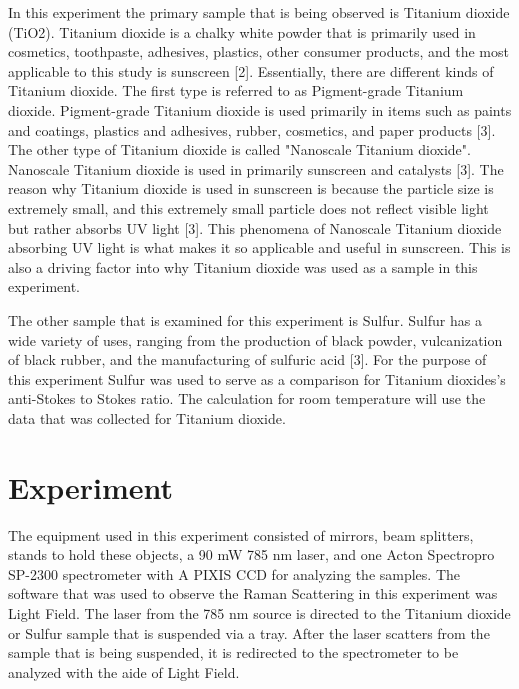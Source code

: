 \documentclass[twocolumn]{article}
\begin{document}
In this experiment the primary sample that is being observed is Titanium dioxide (TiO2). Titanium dioxide is a chalky white powder that is primarily used in cosmetics, toothpaste, adhesives, plastics, other consumer products, and the most applicable to this study is sunscreen [2]. Essentially, there are different kinds of Titanium dioxide. The first type is referred to as Pigment-grade Titanium dioxide. Pigment-grade Titanium dioxide is used primarily in items such as paints and coatings, plastics and adhesives, rubber, cosmetics, and paper products [3]. The other type of Titanium dioxide is called "Nanoscale Titanium dioxide". Nanoscale Titanium dioxide is used in primarily sunscreen and catalysts [3]. The reason why Titanium dioxide is used in sunscreen is because the particle size is extremely small, and this extremely small particle does not reflect visible light but rather absorbs UV light [3]. This phenomena of Nanoscale Titanium dioxide absorbing UV light is what makes it so applicable and useful in sunscreen. This is also a driving factor into why Titanium dioxide was used as a sample in this experiment. 

The other sample that is examined for this experiment is Sulfur. Sulfur has a wide variety of uses, ranging from the production of black powder, vulcanization of black rubber, and the manufacturing of sulfuric acid [3]. For the purpose of this experiment Sulfur was used to serve as a comparison for Titanium dioxides's anti-Stokes to Stokes ratio. The calculation for room temperature will use the data that was collected for Titanium dioxide.
\section*{Experiment}
The equipment used in this experiment consisted of mirrors, beam splitters, stands to hold these objects, a 90 mW 785 nm laser, and one Acton Spectropro SP-2300  spectrometer with A PIXIS CCD for analyzing the samples. The software that was used to observe the Raman Scattering in this experiment was Light Field. The laser from the 785 nm source is directed to the Titanium dioxide or Sulfur sample that is suspended via a tray. After the laser scatters from the sample that is being suspended, it is redirected to the spectrometer to be analyzed with the aide of Light Field. 
\end{document}
